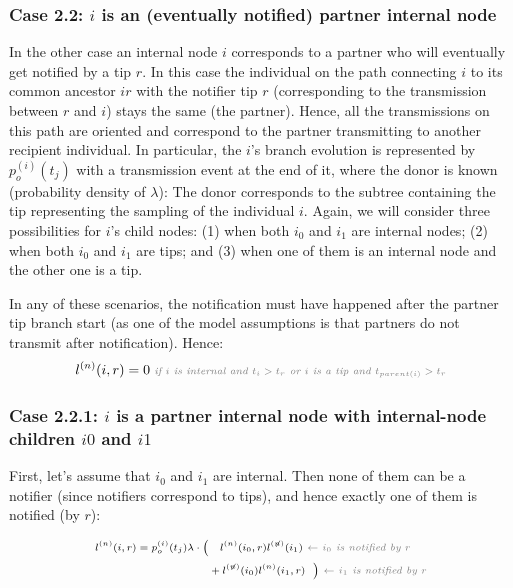 \documentclass[a4paper,10pt]{article}
\begin{document}
\subsubsection*{Case 2.2: $i$ is an (eventually notified) partner internal node} 

In the other case an internal node $i$ corresponds to a partner who will eventually get notified by a tip $r$. In this case the individual on the path connecting $i$ to its common ancestor $ir$ with the notifier tip $r$ (corresponding to the transmission between $r$ and $i$) stays the same (the partner). Hence, all the transmissions on this path are oriented and correspond to the partner transmitting to another recipient individual. In particular, the $i$'s branch evolution is represented by $p_o^{(i)}(t_j)$ with a transmission event at the end of it, where the donor is known (probability density of $\lambda$): The donor corresponds to the subtree containing the tip representing the sampling of the individual $i$. %
Again, we will consider three possibilities for $i$'s child nodes: (1) when both $i_0$ and $i_1$ are internal nodes; (2) when both $i_0$ and $i_1$ are tips; and (3) when one of them is an internal node and the other one is a tip.

In any of these scenarios, the notification must have happened after the partner tip branch start (as one of the model assumptions is that partners do not transmit after notification). Hence:
\begin{equation}
\scriptsize
l^{(n)}(i, r) = 0 \textit{\color{gray}~if $i$ is internal and $t_i > t_r$ or $i$ is a tip and $t_{parent(i)} > t_r$} \\
\label{eq:lp-zero}
\end{equation}

\subsubsection*{Case 2.2.1: $i$ is a partner internal node with internal-node children $i0$ and $i1$} 

First, let's assume that $i_0$ and $i_1$ are internal. Then none of them can be a notifier (since notifiers correspond to tips), and hence exactly one of them is notified (by $r$):

\begin{equation}
\scriptsize
\begin{split}
l^{(n)}(i, r) = p_o^{(i)}(t_j) \lambda \cdot
\Big(&~~~l^{(n)}(i_0,r)l^{(\not{n})}(i_1) \textit{\color{gray}~$\leftarrow$ $i_0$ is notified by $r$} \\
& + l^{(\not{n})}(i_0)l^{(n)}(i_1,r)~~\Big) \textit{\color{gray}~$\leftarrow$ $i_1$ is notified by $r$} \\
 \end{split}
\label{eq:lp-int-int}
\end{equation}
\end{document}
